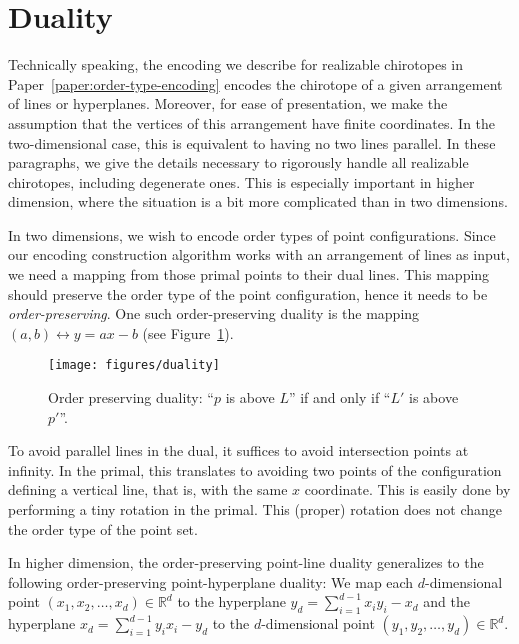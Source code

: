 \section{Duality}%
\label{sec:point-configurations:duality}

Technically speaking, the encoding we describe for realizable chirotopes
in Paper~\ref{paper:order-type-encoding}
encodes the chirotope of a given arrangement of lines or hyperplanes.
Moreover, for ease of presentation, we make the assumption that the vertices of
this arrangement have finite coordinates. In the two-dimensional case, this
is equivalent to having no two lines parallel. In these paragraphs, we give the
details necessary to rigorously handle all realizable chirotopes, including
degenerate ones. This is especially important in higher dimension, where the
situation is a bit more complicated than in two dimensions.

In two dimensions, we wish to encode order types of point configurations.
Since our encoding construction algorithm works with an arrangement of lines as
input, we need a mapping from those primal points to their dual lines. This
mapping should preserve the order type of the point configuration, hence it
needs to be \emph{order-preserving}. One such order-preserving duality is
the mapping \((a,b) \leftrightarrow y = ax - b\) (see Figure~\ref{fig:duality}).

\begin{figure}
  \centering{}
  \texttt{[image: figures/duality]}
  \caption{Order preserving duality: ``\(p\) is above \(L\)'' if and only if
  ``\(L'\) is above \(p'\)''.}\label{fig:duality}
\end{figure}

To avoid parallel lines in the dual, it suffices to avoid intersection points
at infinity. In the primal, this translates to avoiding two points of the
configuration defining a vertical line, that is, with the same \(x\) coordinate.
This is easily done by performing a tiny rotation in the primal.
This (proper) rotation does not change the order type of the point set.

In higher dimension, the order-preserving point-line duality generalizes
to the following order-preserving point-hyperplane duality: We map each
\(d\)-dimensional point \((x_1, x_2, \ldots, x_d) \in \mathbb{R}^d\) to the hyperplane \(y_d =
\sum_{i=1}^{d-1} x_i y_i - x_d \) and the hyperplane \(x_d = \sum_{i=1}^{d-1}
y_i x_i - y_d \) to the \(d\)-dimensional point \(( y_1, y_2, \ldots, y_d) \in
\mathbb{R}^d\).

